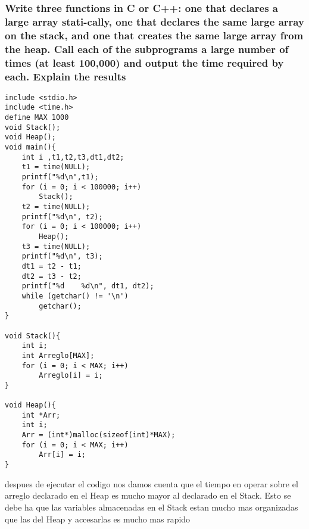 \subsubsection{Write three functions in C or C++: one that declares a large array stati-cally, one that declares the same large array on the stack, and one that  creates the same large array from the heap. Call each of the subprograms a large number of times (at least 100,000) and output the time required by each. Explain the results}


\lstset{language = C} 
\begin{lstlisting}[frame = single] %Comienzo del Código
include <stdio.h>
include <time.h>
define MAX 1000
void Stack();
void Heap();
void main(){
	int i ,t1,t2,t3,dt1,dt2;
	t1 = time(NULL);
	printf("%d\n",t1);
	for (i = 0; i < 100000; i++)
		Stack();
	t2 = time(NULL);
	printf("%d\n", t2);
	for (i = 0; i < 100000; i++)
		Heap();
	t3 = time(NULL);
	printf("%d\n", t3);
	dt1 = t2 - t1;
	dt2 = t3 - t2;
	printf("%d    %d\n", dt1, dt2);
	while (getchar() != '\n')
		getchar();
}

void Stack(){
	int i;
	int Arreglo[MAX];
	for (i = 0; i < MAX; i++)
		Arreglo[i] = i;
}

void Heap(){
	int *Arr;
	int i;
	Arr = (int*)malloc(sizeof(int)*MAX);
	for (i = 0; i < MAX; i++)
		Arr[i] = i;
}

\end{lstlisting}
despues de ejecutar el codigo  nos damos cuenta que el tiempo en operar sobre el arreglo declarado en el Heap es mucho mayor al declarado en el Stack. Esto se debe ha que las variables almacenadas en el Stack estan mucho mas organizadas que las del Heap y accesarlas es mucho mas rapido

	